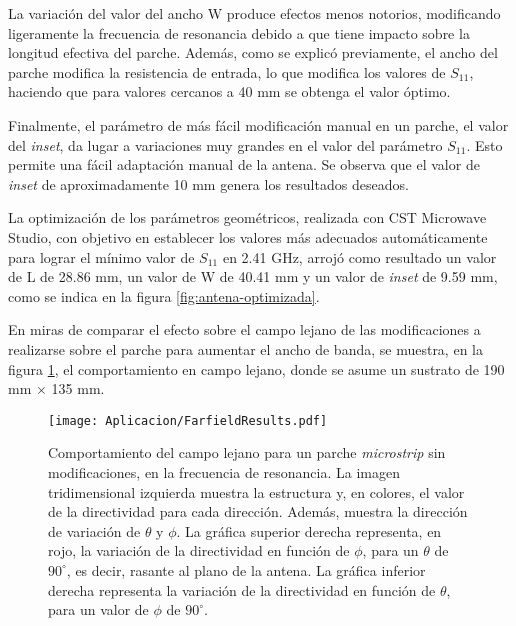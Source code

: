 La variación del valor del ancho W produce efectos menos notorios, modificando ligeramente la frecuencia de resonancia debido a que tiene impacto sobre la longitud efectiva del parche. Además, como se explicó previamente, el ancho del parche modifica la resistencia de entrada, lo que modifica  los valores de $S_{11}$, haciendo que para valores cercanos a 40 mm se obtenga el valor óptimo.

Finalmente, el parámetro de más fácil modificación manual en un parche, el valor del \textit{inset}, da lugar a variaciones muy grandes en el valor del parámetro $S_{11}$. Esto permite una fácil adaptación manual de la antena. Se observa que el valor de \textit{inset} de aproximadamente 10 mm genera los resultados deseados.

La optimización de los parámetros geométricos, realizada con CST Microwave Studio, con objetivo en establecer los valores más adecuados automáticamente para lograr el mínimo valor de $S_{11}$ en 2.41 GHz, arrojó como resultado un valor de L de 28.86 mm, un valor de W de 40.41 mm y un valor de \textit{inset} de 9.59 mm, como se indica en la figura \ref{fig:antena-optimizada}.

En miras de comparar el efecto sobre el campo lejano de las modificaciones a realizarse sobre el parche para aumentar el ancho de banda, se muestra, en la figura \ref{fig:farfield-1parche-sincarga-sinebg}, el comportamiento en campo lejano, donde se asume un sustrato de 190 mm $\times$ 135 mm.

\begin{figure}[h]
	\centering
	\texttt{[image: Aplicacion/FarfieldResults.pdf]}
	\caption{Comportamiento del campo lejano para un parche \textit{microstrip} sin modificaciones, en la frecuencia de resonancia. La imagen tridimensional izquierda muestra la estructura y, en colores, el valor de la directividad para cada dirección. Además, muestra la dirección de variación de $\theta$ y $\phi$. La gráfica superior derecha representa, en rojo, la variación de la directividad en función de $\phi$, para un $\theta$ de $90^{\circ}$, es decir, rasante al plano de la antena. La gráfica inferior derecha representa la variación de la directividad en función de $\theta$, para un valor de $\phi$ de $90^{\circ}$.}
	\label{fig:farfield-1parche-sincarga-sinebg}
\end{figure}



